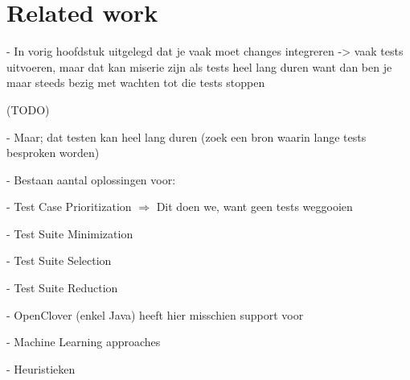 \chapter{Related work}
- In vorig hoofdstuk uitgelegd dat je vaak moet changes integreren -> vaak tests uitvoeren, maar dat kan miserie zijn als tests heel lang duren want dan ben je maar steeds bezig met wachten tot die tests stoppen

(TODO)

- Maar; dat testen kan heel lang duren (zoek een bron waarin lange tests besproken worden)

- Bestaan aantal oplossingen voor:

  - Test Case Prioritization $\Rightarrow$ Dit doen we, want geen tests weggooien

- Test Suite Minimization

- Test Suite Selection

- Test Suite Reduction

- OpenClover (enkel Java) heeft hier misschien support voor

- Machine Learning approaches

- Heuristieken